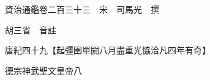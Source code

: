 










 


 
 


 

  
  
  
  
  





  
  
  
  
  
 
  

  

  
  
  



  

 
 

  
   




  

  
  


  　　資治通鑑卷二百三十三　宋　司馬光　撰

　　胡三省　音註

　　唐紀四十九【起彊圉單閼八月盡重光恊洽凡四年有奇】

　　德宗神武聖文皇帝八

